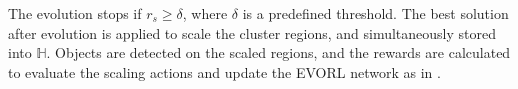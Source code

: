 \documentclass[letterpaper]{article} %
\newcommand\red[1]{\textcolor{red}{#1}}
\newcommand\purple[1]{\textcolor{purple}{#1}}
\newcommand\rjf[1]{\textcolor{red}{\{RJF: #1\}}}
\newcommand\hwt[1]{\textcolor{purple}{\{HWT: #1\}}}
\begin{document}
The evolution stops if $r_s \geq \delta$, where $\delta$ is a predefined threshold. %
The best solution after evolution is applied to scale the cluster regions, and simultaneously stored into $\mathbb{H}$. Objects are detected on the scaled regions, and the rewards are calculated to evaluate the scaling actions and update the EVORL network as in \cite{araslanov2019actor}.


\end{document}
